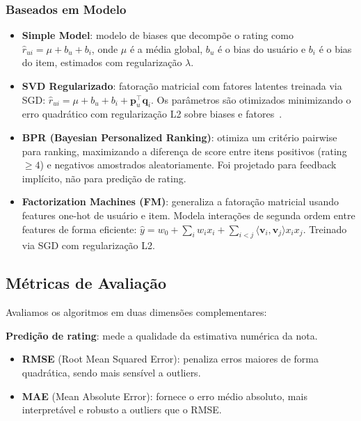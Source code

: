 \documentclass[sigconf,nonacm]{acmart}
\begin{document}
\subsubsection{Baseados em Modelo}

\begin{itemize}
  \item \textbf{Simple Model}: modelo de biases que decompõe o rating como
    $\hat{r}_{ui} = \mu + b_u + b_i$, onde $\mu$ é a média global, $b_u$ é o
    bias do usuário e $b_i$ é o bias do item, estimados com regularização $\lambda$.
  \item \textbf{SVD Regularizado}: fatoração matricial com fatores latentes
    treinada via SGD:
    $\hat{r}_{ui} = \mu + b_u + b_i + \mathbf{p}_u^\top \mathbf{q}_i$.
    Os parâmetros são otimizados minimizando o erro quadrático com
    regularização L2 sobre biases e fatores~\cite{koren2009}.
  \item \textbf{BPR (Bayesian Personalized Ranking)}: otimiza um critério
    pairwise para ranking, maximizando a diferença de score entre itens
    positivos (rating $\geq 4$) e negativos amostrados aleatoriamente. Foi
    projetado para feedback implícito, não para predição de rating.
  \item \textbf{Factorization Machines (FM)}: generaliza a fatoração matricial
    usando features one-hot de usuário e item. Modela interações de segunda
    ordem entre features de forma eficiente:
    $\hat{y} = w_0 + \sum_i w_i x_i + \sum_{i<j} \langle \mathbf{v}_i, \mathbf{v}_j \rangle x_i x_j$.
    Treinado via SGD com regularização L2.
\end{itemize}

\subsection{Métricas de Avaliação}

Avaliamos os algoritmos em duas dimensões complementares:

\textbf{Predição de rating}: mede a qualidade da estimativa numérica da nota.
\begin{itemize}
  \item \textbf{RMSE} (Root Mean Squared Error): penaliza erros maiores de
    forma quadrática, sendo mais sensível a outliers.
  \item \textbf{MAE} (Mean Absolute Error): fornece o erro médio absoluto, mais
    interpretável e robusto a outliers que o RMSE.
\end{itemize}
\end{document}

